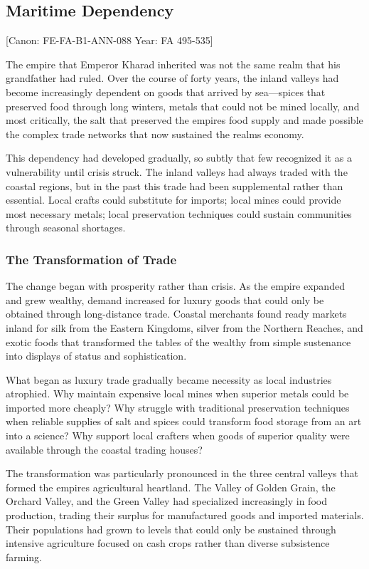 \subsection{Maritime Dependency}\label{maritime-dependency}

{[}Canon: FE-FA-B1-ANN-088 \textbar{} Year: FA 495-535{]}

The empire that Emperor Kharad inherited was not the same realm that his
grandfather had ruled. Over the course of forty years, the inland
valleys had become increasingly dependent on goods that arrived by
sea---spices that preserved food through long winters, metals that could
not be mined locally, and most critically, the salt that preserved the
empire\textquotesingle s food supply and made possible the complex trade
networks that now sustained the realm\textquotesingle s economy.

This dependency had developed gradually, so subtly that few recognized
it as a vulnerability until crisis struck. The inland valleys had always
traded with the coastal regions, but in the past this trade had been
supplemental rather than essential. Local crafts could substitute for
imports; local mines could provide most necessary metals; local
preservation techniques could sustain communities through seasonal
shortages.

\subsubsection{The Transformation of
Trade}\label{the-transformation-of-trade}

The change began with prosperity rather than crisis. As the empire
expanded and grew wealthy, demand increased for luxury goods that could
only be obtained through long-distance trade. Coastal merchants found
ready markets inland for silk from the Eastern Kingdoms, silver from the
Northern Reaches, and exotic foods that transformed the tables of the
wealthy from simple sustenance into displays of status and
sophistication.

What began as luxury trade gradually became necessity as local
industries atrophied. Why maintain expensive local mines when superior
metals could be imported more cheaply? Why struggle with traditional
preservation techniques when reliable supplies of salt and spices could
transform food storage from an art into a science? Why support local
crafters when goods of superior quality were available through the
coastal trading houses?

The transformation was particularly pronounced in the three central
valleys that formed the empire\textquotesingle s agricultural heartland.
The Valley of Golden Grain, the Orchard Valley, and the Green Valley had
specialized increasingly in food production, trading their surplus for
manufactured goods and imported materials. Their populations had grown
to levels that could only be sustained through intensive agriculture
focused on cash crops rather than diverse subsistence farming.

